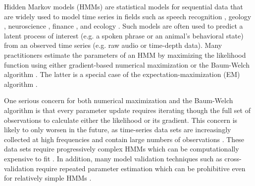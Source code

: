 

Hidden Markov models (HMMs) are statistical models for sequential data that are widely used to model time series in fields such as speech recognition \citep{Gales:2008}, geology \citep{Bebbington:2007}, neuroscience \citep{Kottaram:2019}, finance \citep{Mamon:2007}, and ecology \citep{McClintock:2020}. Such models are often used to predict a latent process of interest (e.g. a spoken phrase or an animal's behavioral state) from an observed time series (e.g. raw audio or time-depth data). %
Many practitioners estimate the parameters of an HMM by maximizing the likelihood function using either gradient-based numerical maximization or the Baum-Welch algorithm \citep{Baum:1970}. The latter is a special case of the expectation-maximization (EM) algorithm \citep{Dempster:1977}. 

One serious concern for both numerical maximization and the Baum-Welch algorithm is that every parameter update requires iterating though the full set of observations to calculate either the likelihood or its gradient. This concern is likely to only worsen in the future, as time-series data sets are increasingly collected at high frequencies and contain large numbers of observations \citep{Patterson:2017,Li:2020}. These data sets require progressively complex HMMs which can be computationally expensive to fit \citep{Adam:2019,Sidrow:2021}. In addition, many model validation techniques such as cross-validation require repeated parameter estimation which can be prohibitive even for relatively simple HMMs \citep{Pohle:2017}.

